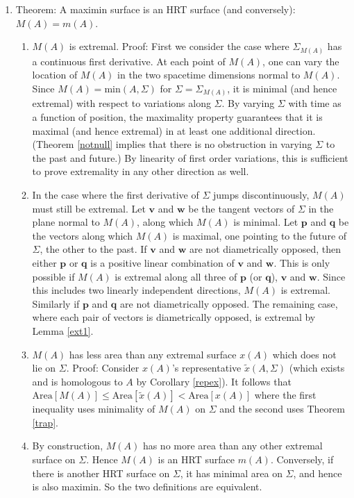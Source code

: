 \documentclass{article}
\begin{document}
\begin{enumerate}[resume]
\item \label{Mism} Theorem: A maximin surface is an HRT surface (and conversely): $M(A) = m(A)$.
	\begin{enumerate}
	\item \label{ext1} $M(A)$ is extremal.  Proof: First we consider the case where $\Sigma_{M(A)}$ has a continuous first derivative.  At each point of $M(A)$, one can vary the location of $M(A)$ in the two spacetime dimensions normal to $M(A)$.  Since $M(A) = \mathrm{min}(A,\Sigma)$ for $\Sigma = \Sigma_{M(A)}$, it is minimal (and hence extremal) with respect to variations along $\Sigma$.  By varying $\Sigma$ with time as a function of position, the maximality property guarantees that it is maximal (and hence extremal) in at least one additional direction.  (Theorem \ref{notnull} implies that there is no obstruction in varying $\Sigma$ to the past and future.)  By linearity of first order variations, this is sufficient to prove extremality in any other direction as well.
	\item \label{ext2} In the case where the first derivative of $\Sigma$ jumps discontinuously, $M(A)$ must still be extremal.  Let $\mathbf{v}$ and $\mathbf{w}$ be the tangent vectors of $\Sigma$ in the plane normal to $M(A)$, along which $M(A)$ is minimal.  Let $\mathbf{p}$ and $\mathbf{q}$ be the vectors along which $M(A)$ is maximal, one pointing to the future of $\Sigma$, the other to the past.  If $\mathbf{v}$ and $\mathbf{w}$ are not diametrically opposed, then either $\mathbf{p}$ or $\mathbf{q}$ is a positive linear combination of $\mathbf{v}$ and $\mathbf{w}$.  This is only possible if $M(A)$ is extremal along all three of $\mathbf{p}$ (or $\mathbf{q}$), $\mathbf{v}$ and $\mathbf{w}$.  Since this includes two linearly independent directions, $M(A)$ is extremal.  Similarly if $\mathbf{p}$ and $\mathbf{q}$ are not diametrically opposed.  The remaining case, where each pair of vectors is diametrically opposed, is extremal by Lemma \ref{ext1}.
	\item \label{RT1} $M(A)$ has less area than any extremal surface $x(A)$ which does not lie on $\Sigma$.  Proof: Consider $x(A)$'s representative $\tilde{x}(A,\Sigma)$ (which exists and is homologous to $A$ by Corollary \ref{repex}).  It follows that $\mathrm{Area}[M(A)] \le \mathrm{Area}[\tilde{x}(A)] < \mathrm{Area}[x(A)]$ where the first inequality uses minimality of $M(A)$ on $\Sigma$ and the second uses Theorem \ref{trap}.
	\item \label{RT2} By construction, $M(A)$ has no more area than any other extremal surface on $\Sigma$.  Hence $M(A)$ is an HRT surface $m(A)$.  Conversely, if there is another HRT surface on $\Sigma$, it has minimal area on $\Sigma$, and hence is also maximin.  So the two definitions are equivalent.

\end{enumerate}
\end{enumerate}
\end{document}
